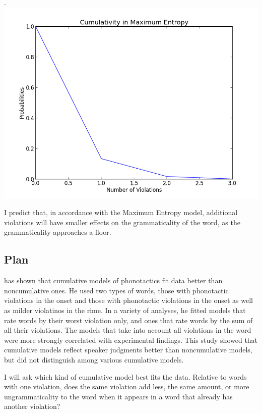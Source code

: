 \ex. \includegraphics[scale=.5]{me_cumulativity.png}

I predict that, in accordance with the Maximum Entropy model, additional violations
will have smaller effects on the grammaticality of the word, as the grammaticality approaches a floor.



\subsection{Plan}

\citet{Albright_clusters_2008} has shown that cumulative models of phonotactics fit data
better than noncumulative ones. He used two types of words, those with
phonotactic violations in the onset and those with phonotactic violations in
the onset as well as milder violatinos in the rime. In a variety of analyses,
he fitted models that rate words by their worst violation only, and ones that
rate words by the sum of all their violations. The models that take into
account all violations in the word were more strongly correlated with experimental
findings. This study showed that cumulative models reflect speaker judgments better
than noncumulative models, but did not distinguish among various cumulative models.

I will ask which kind of cumulative model best fits the data.  Relative to
words with one violation, does the same violation add less, the same amount, or
more ungrammaticality to the word when it appears in a word that already has
another violation?

